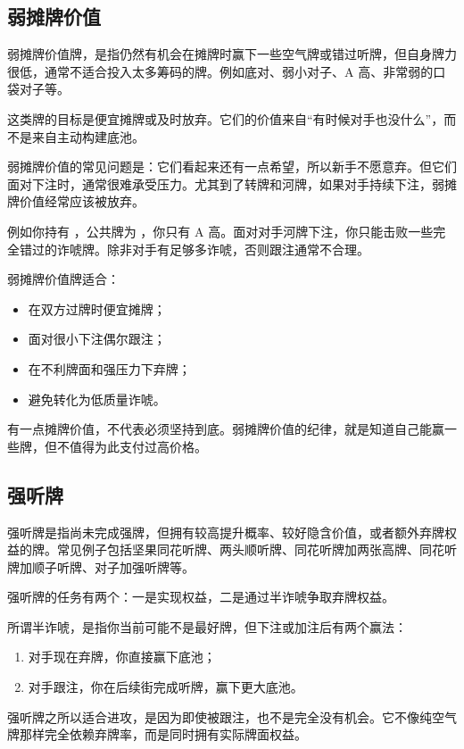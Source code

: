 \subsection{弱摊牌价值}

弱摊牌价值牌，是指仍然有机会在摊牌时赢下一些空气牌或错过听牌，但自身牌力很低，通常不适合投入太多筹码的牌。例如底对、弱小对子、A 高、非常弱的口袋对子等。

这类牌的目标是便宜摊牌或及时放弃。它们的价值来自“有时候对手也没什么”，而不是来自主动构建底池。

弱摊牌价值的常见问题是：它们看起来还有一点希望，所以新手不愿意弃。但它们面对下注时，通常很难承受压力。尤其到了转牌和河牌，如果对手持续下注，弱摊牌价值经常应该被放弃。

例如你持有 ，公共牌为 ，你只有 A 高。面对对手河牌下注，你只能击败一些完全错过的诈唬牌。除非对手有足够多诈唬，否则跟注通常不合理。

弱摊牌价值牌适合：

\begin{itemize}
\item 在双方过牌时便宜摊牌；
\item 面对很小下注偶尔跟注；
\item 在不利牌面和强压力下弃牌；
\item 避免转化为低质量诈唬。
\end{itemize}

有一点摊牌价值，不代表必须坚持到底。弱摊牌价值的纪律，就是知道自己能赢一些牌，但不值得为此支付过高价格。

\subsection{强听牌}

强听牌是指尚未完成强牌，但拥有较高提升概率、较好隐含价值，或者额外弃牌权益的牌。常见例子包括坚果同花听牌、两头顺听牌、同花听牌加两张高牌、同花听牌加顺子听牌、对子加强听牌等。

强听牌的任务有两个：一是实现权益，二是通过半诈唬争取弃牌权益。

所谓半诈唬，是指你当前可能不是最好牌，但下注或加注后有两个赢法：

\begin{enumerate}
\item 对手现在弃牌，你直接赢下底池；
\item 对手跟注，你在后续街完成听牌，赢下更大底池。
\end{enumerate}

强听牌之所以适合进攻，是因为即使被跟注，也不是完全没有机会。它不像纯空气牌那样完全依赖弃牌率，而是同时拥有实际牌面权益。

